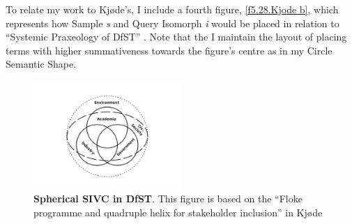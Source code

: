 To relate my work to Kjøde’s, I include a fourth figure, \autoref{f5.28.Kjode b}, which represents how Sample \textit{s} and Query Isomorph \textit{i} would be placed in relation to “Systemic Praxeology of DfST” \citep[p. 144]{kjode_entanglement_2024}. Note that the I maintain the layout of placing terms with higher summativeness towards the figure’s centre as in my Circle Semantic Shape.

\FloatBarrier  
\begin{figure}[h!]
    \centering
    \includegraphics[width=0.5\textwidth]{figures/5.23.png}
    \caption[Spherical SIVC in DfST]{ \textbf{Spherical SIVC in DfST}. This figure is based on the “Floke programme and quadruple helix for stakeholder inclusion” in Kjøde \citep[p. 125]{kjode_entanglement_2024}
}
    \label{f5.23}
\end{figure}




